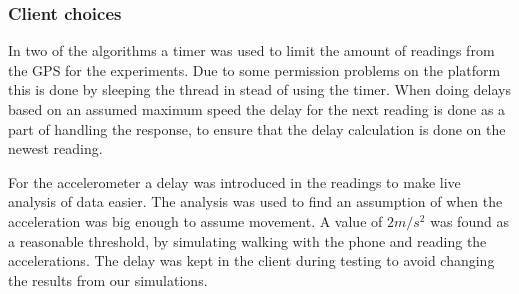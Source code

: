 \subsubsection{Client choices}
In two of the algorithms a timer was used to limit the amount of readings from the GPS for the experiments. Due to some permission problems on the platform this is done by sleeping the thread in stead of using the timer. When doing delays based on an assumed maximum speed the delay for the next reading is done as a part of handling the response, to ensure that the delay calculation is done on the newest reading.

For the accelerometer a delay was introduced in the readings to make live analysis of data easier. The analysis was used to find an assumption of when the acceleration was big enough to assume movement. A value of $2 m/s^2$ was found as a reasonable threshold, by simulating walking with the phone and reading the accelerations. The delay was kept in the client during testing to avoid changing the results from our simulations.